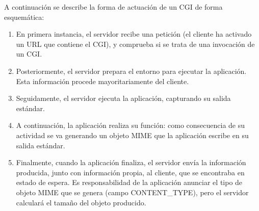 \documentclass[a4paper]{report}
\begin{document}
A continuación se describe la forma de actuación de un CGI de forma esquemática:
\begin{enumerate}
  \item{En primera instancia, el servidor recibe una petición (el cliente ha
activado un URL que contiene el CGI), y comprueba si se trata de una invocación
de un CGI.}
  \item{Posteriormente, el servidor prepara el entorno para ejecutar la
aplicación. Esta información procede mayoritariamente del cliente.}
  \item{Seguidamente, el servidor ejecuta la aplicación, capturando su salida
estándar.}
  \item{A continuación, la aplicación realiza su función: como consecuencia de
su actividad se va generando un objeto MIME que la aplicación escribe en su
salida estándar.}
  \item{Finalmente, cuando la aplicación finaliza, el servidor envía la
información producida, junto con información propia, al cliente, que se
encontraba en estado de espera.
Es responsabilidad de la aplicación anunciar el
tipo de objeto MIME que se genera (campo CONTENT\_TYPE), pero el servidor
calculará el tamaño del objeto producido.}
\end{enumerate}
\end{document}
